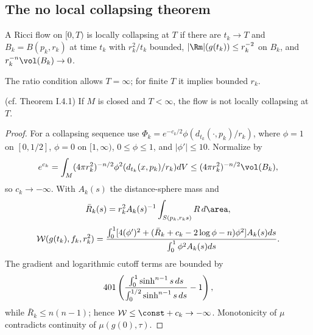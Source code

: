 \subsection{The no local collapsing theorem}
\begin{definition}
  \label{def:kl-no-local-collapsing-theorem-i-locally-collapsing-definition}
A Ricci flow on $[0,T)$ is locally collapsing at $T$ if there are $t_k\to T$ and
$B_k=B(p_k,r_k)$ at time $t_k$ with $r_k^2/t_k$ bounded,
$|\Rm|(g(t_k))\le r_k^{-2}$ on $B_k$, and $r_k^{-n}\vol(B_k)\to0$.
\end{definition}
\begin{remark}
  \label{rem:kl-no-local-collapsing-theorem-i-estimates-noncollapsing}
The ratio condition allows $T=\infty$; for finite $T$ it implies bounded $r_k$.
\end{remark}
\begin{theorem}
  \label{thm:kl-no-local-collapsing-theorem-i-noncollapsing-theorem}
  \label{noncollthm} (cf. Theorem I.4.1)
If $M$ is closed and $T<\infty$, the flow is not locally collapsing at $T$.
\end{theorem}
\begin{proof}
\sketch
For a collapsing sequence use $\Phi_k=e^{-c_k/2}\phi(d_{t_k}(\cdot,p_k)/r_k)$, where
$\phi=1$ on $[0,1/2]$, $\phi=0$ on $[1,\infty)$, $0\le\phi\le1$, and
$|\phi'|\le10$. Normalize by
\begin{equation}\label{normalization}
e^{c_k}=\int_M(4\pi r_k^2)^{-n/2}\phi^2(d_{t_k}(x,p_k)/r_k)dV
\le(4\pi r_k^2)^{-n/2}\vol(B_k),
\end{equation}
so $c_k\to-\infty$. With $A_k(s)$ the distance-sphere mass and
\begin{equation}
\bar R_k(s)=r_k^2A_k(s)^{-1}\int_{S(p_k,r_ks)}R\,d\area,
\end{equation}
\begin{equation}\label{mess}
{\mathcal W}(g(t_k),f_k,r_k^2)=
{\int_0^1[4(\phi')^2+(\bar R_k+c_k-2\log\phi-n)\phi^2]A_k(s)ds\over\int_0^1\phi^2A_k(s)ds}.
\end{equation}
The gradient and logarithmic cutoff terms are bounded by
\begin{equation}
401\left({\int_0^1\sinh^{n-1}s\,ds\over\int_0^{1/2}\sinh^{n-1}s\,ds}-1\right),
\end{equation}
while $\bar R_k\le n(n-1)$; hence ${\mathcal W}\le\const+c_k\to-\infty$.
Monotonicity of $\mu$ contradicts continuity of $\mu(g(0),\tau)$.
\end{proof}
